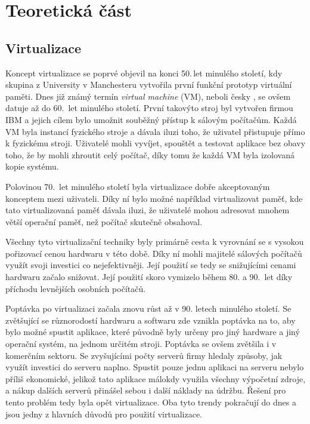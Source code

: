 \chapter{Teoretická část}\label{chap:teorie}


\section{Virtualizace}

Koncept virtualizace se poprvé objevil na konci 50.\,let minulého století, kdy skupina z University v Manchesteru vytvořila první funkční prototyp virtuální paměti. Dnes již známý termín \textit{virtual machine} (VM), neboli česky , se ovšem datuje až do 60.\, let minulého století. První takovýto stroj byl vytvořen firmou IBM a jejich cílem bylo umožnit souběžný přístup k sálovým počítačům. Každá VM byla instancí fyzického stroje a dávala iluzi toho, že uživatel přistupuje přímo k fyzickému stroji. Uživatelé mohli vyvíjet, spouštět a testovat aplikace bez obavy toho, že by mohli zhroutit celý počítač, díky tomu že každá VM byla izolovaná kopie systému. 

Polovinou 70.\, let minulého století byla virtualizace dobře akceptovaným konceptem mezi uživateli. Díky ní bylo možné například virtualizovat paměť, kde tato virtualizovaná paměť dávala iluzi, že uživatelé mohou adresovat mnohem větší operační paměť, než počítač skutečně obsahoval. 

Všechny tyto virtualizační techniky byly primárně cesta k vyrovnání se s vysokou pořizovací cenou hardwaru v této době. Díky ní mohli majitelé sálových počítačů využít svoji investici co nejefektivněji. Její použití se tedy se snižujícími cenami hardwaru začalo snižovat. Její použití skoro vymizelo během 80. a 90.\, let díky příchodu levnějších osobních počítačů.  

Poptávka po virtualizaci začala znovu růst až v 90. letech minulého století. Se zvětšující se různorodostí hardwaru a softwaru zde vznikla poptávka na to, aby bylo možné spustit aplikace, které původně byly určeny pro jiný hardware a jiný operační systém, na jednom určitém stroji. Poptávka se ovšem zvětšila i v komerčním sektoru. Se zvyšujícími počty serverů firmy hledaly způsoby, jak využít investici do serveru naplno. Spustit pouze jednu aplikaci na serveru nebylo příliš ekonomické, jelikož tato aplikace málokdy využila všechny výpočetní zdroje, a nákup dalších serverů přinášel sebou i další náklady na údržbu. Řešení pro tento problém tedy byla opět virtualizace. Oba tyto trendy pokračují do dnes a jsou jedny z hlavních důvodů pro použití virtualizace. 

